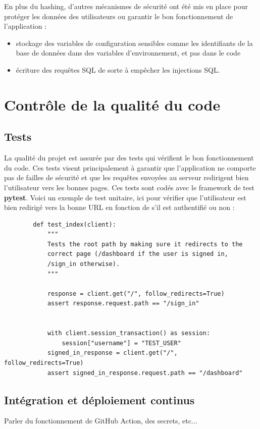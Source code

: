 \documentclass[french]{article}
\begin{document}
    En plus du hashing, d'autres mécanismes de sécurité ont été mis en place pour protéger les données des utilisateurs ou garantir le bon fonctionnement de l'application :
    \begin{itemize}
        \item stockage des variables de configuration sensibles comme les identifiants de la base de données dans des variables d'environnement, et pas dans le code
        \item écriture des requêtes SQL de sorte à empêcher les injections SQL.
    \end{itemize}
    \section{Contrôle de la qualité du code}
    
    \subsection{Tests}
    La qualité du projet est assurée par des tests qui vérifient le bon fonctionnement du code. Ces tests visent principalement à garantir que l'application ne comporte pas de failles de sécurité et que les requêtes envoyées au serveur redirigent bien l'utilisateur vers les bonnes pages. Ces tests sont codés avec le framework de test \textbf{pytest}. Voici un exemple de test unitaire, ici pour vérifier que l'utilisateur est bien redirigé vers la bonne URL en fonction de s'il est authentifié ou non :
    \begin{verbatim}
        def test_index(client):
            """
            Tests the root path by making sure it redirects to the 
            correct page (/dashboard if the user is signed in,
            /sign_in otherwise).
            """

            response = client.get("/", follow_redirects=True)
            assert response.request.path == "/sign_in"


            with client.session_transaction() as session:
                session["username"] = "TEST_USER"
            signed_in_response = client.get("/", follow_redirects=True)
            assert signed_in_response.request.path == "/dashboard"
    \end{verbatim}

    \subsection{Intégration et déploiement continus}
    Parler du fonctionnement de GitHub Action, des secrets, etc...
    
\end{document}
